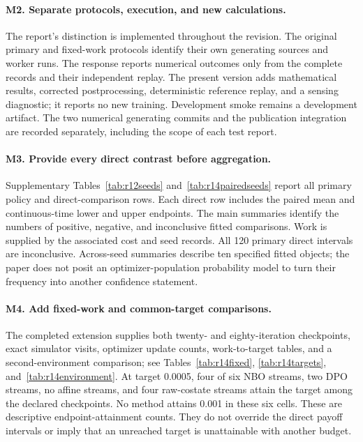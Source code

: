 \paragraph*{M2. Separate protocols, execution, and new calculations.}
The report's distinction is implemented throughout the revision. The original primary and fixed-work protocols identify their own generating sources and worker runs. The response reports numerical outcomes only from the complete records and their independent replay. The present version adds mathematical results, corrected postprocessing, deterministic reference replay, and a sensing diagnostic; it reports no new training. Development smoke remains a development artifact. The two numerical generating commits and the publication integration are recorded separately, including the scope of each test report.

\paragraph*{M3. Provide every direct contrast before aggregation.}
Supplementary Tables~\ref{tab:r12seeds} and~\ref{tab:r14pairedseeds} report all primary policy and direct-comparison rows. Each direct row includes the paired mean and continuous-time lower and upper endpoints. The main summaries identify the numbers of positive, negative, and inconclusive fitted comparisons. Work is supplied by the associated cost and seed records. All 120 primary direct intervals are inconclusive. Across-seed summaries describe ten specified fitted objects; the paper does not posit an optimizer-population probability model to turn their frequency into another confidence statement.

\paragraph*{M4. Add fixed-work and common-target comparisons.}
The completed extension supplies both twenty- and eighty-iteration checkpoints, exact simulator visits, optimizer update counts, work-to-target tables, and a second-environment comparison; see Tables~\ref{tab:r14fixed}, \ref{tab:r14targets}, and~\ref{tab:r14environment}. At target 0.0005, four of six NBO streams, two DPO streams, no affine streams, and four raw-costate streams attain the target among the declared checkpoints. No method attains 0.001 in these six cells. These are descriptive endpoint-attainment counts. They do not override the direct payoff intervals or imply that an unreached target is unattainable with another budget.

